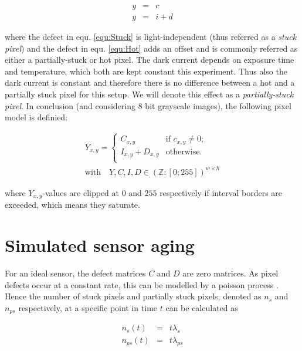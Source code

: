 \documentclass[10pt,twocolumn,letterpaper]{article}
\begin{document}
\begin{eqnarray}
     y & = & c \label{equ:Stuck} \\
  y & = & i + d \label{equ:Hot}
  \end{eqnarray}
  
where the defect in equ. \ref{equ:Stuck} is light-independent (thus referred as a \emph{stuck pixel}) and the defect in equ. \ref{equ:Hot} adds an offset and is commonly referred as either a partially-stuck or hot pixel. The dark current depends on exposure time and temperature, which both are kept constant this experiment. Thus also the dark current is constant and therefore there is no difference between a hot and a partially stuck pixel for this setup. We will denote this effect as a \emph{partially-stuck pixel}. In conclusion (and considering 8 bit grayscale images), the following pixel model is definied:

\begin{equation}
\begin{aligned}
Y_{x,y} = \begin{cases}
C_{x,y}  & \text{if $c_{x,y} \neq 0$}; \\
I_{x,y} +D_{x,y}  & \text{otherwise}.\\
\end{cases} \\ \text{with} \quad Y,C,I,D \in {(\mathbb{Z}:[0;255])}^{w \times h}
\label{equ:finalPixelModel}
\end{aligned} 
\end{equation}

where $Y_{x,y}$-values are clipped at $0$ and $255$ respectively if interval borders are exceeded, which means they saturate. 

\section{Simulated sensor aging}
\label{virtualAging}
For an ideal sensor, the defect matrices $C$ and $D$ are zero matrices. As pixel defects occur at a constant rate, this can be modelled by a poisson process \cite{fridrich}. Hence the number of stuck pixels and partially stuck pixels, denoted as $n_{s}$ and $n_{ps}$ respectively, at a specific point in time $t$ can be calculated as

\begin{eqnarray}
   n_s(t)  & = & t \lambda_s \\
  n_{ps}(t) & = &  t \lambda_{ps}
\end{eqnarray}
\end{document}
